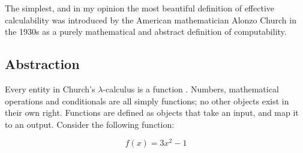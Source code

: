 \documentclass[Master.tex]{subfiles}
\begin{document}
The simplest, and in my opinion the most beautiful definition of effective calculability was introduced by the American mathematician Alonzo Church in the 1930s as a purely mathematical and abstract definition of computability. 

\subsection{Abstraction}

Every entity in Church's $\lambda$-calculus is a function \cite{church1941lambda}. Numbers, mathematical operations and conditionals are all simply functions; no other objects exist in their own right. Functions are defined as objects that take an input, and map it to an output. Consider the following function:

\begin{equation*}
    f(x) = 3x^2 - 1
\end{equation*}
\end{document}
